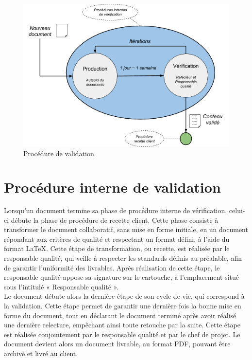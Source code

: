 \begin{figure}[H]
    \centering
    \label{fig-valid}
    \includegraphics[scale=0.5]{figures/validation_part.png}
    \caption{Procédure de validation}
\end{figure}

\section{Procédure interne de validation}
    
Lorsqu’un document termine sa phase de procédure interne de vérification, celui-ci débute la phase de procédure de recette client. Cette phase consiste à transformer le document collaboratif, sans mise en forme initiale, en un document répondant aux critères de qualité et respectant un format défini, à l’aide du format LaTeX. Cette étape de transformation, ou recette, est réalisée par le responsable qualité, qui veille à respecter les standards définis au préalable, afin de garantir l’uniformité des livrables. Après réalisation de cette étape, le responsable qualité appose sa signature sur le cartouche, à l’emplacement situé sous l’intitulé « Responsable qualité ». \\
 
Le document débute alors la dernière étape de son cycle de vie, qui correspond à la validation. Cette étape permet de garantir une dernière fois la bonne mise en forme du document, tout en déclarant le document terminé après avoir réalisé une dernière relecture, empêchant ainsi toute retouche par la suite. Cette étape est réalisée conjointement par le responsable qualité et par le chef de projet. Le document devient alors un document livrable, au format PDF, pouvant être archivé et livré au client. \\
 
